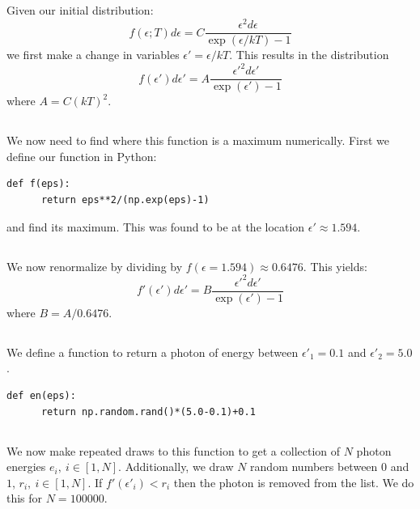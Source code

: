 \documentclass[12pt,a4paper]{article}
\begin{document}
\subsection{}
Given our initial distribution:
\begin{equation*}
  f(\epsilon;T)d\epsilon = C\frac{\epsilon^2d\epsilon}{\exp{(\epsilon/kT)}-1}
\end{equation*}
we first make a change in variables $\epsilon' = \epsilon/kT$. This results
in the distribution
\begin{equation*}
  f(\epsilon')d\epsilon' = A\frac{\epsilon'^2d\epsilon'}{\exp{(\epsilon')}-1}
\end{equation*}
where $A=C(kT)^2$.
\subsection{}
We now need to find where this function is a maximum numerically. First we
define our function in Python:
\begin{lstlisting}[style=custompython]
  def f(eps):
      return eps**2/(np.exp(eps)-1)
\end{lstlisting}
and find its maximum. This was found to be at the 
location $\epsilon'\approx1.594$.
\subsection{}
We now renormalize by dividing by $f(\epsilon=1.594)\approx0.6476$.
This yields:
\begin{equation*}
  f'(\epsilon')d\epsilon' = B\frac{\epsilon'^2d\epsilon'}{\exp{(\epsilon')}-1}
\end{equation*}
where $B=A/0.6476$.
\subsection{}
We define a function to return a photon of energy between $\epsilon'_1=0.1$
and $\epsilon'_2=5.0$.
\begin{lstlisting}[style=custompython]
  def en(eps):
      return np.random.rand()*(5.0-0.1)+0.1
\end{lstlisting}
\subsection{}
We now make repeated draws to this function to get a collection of $N$
photon energies ${e_i},\ i\in[1,N]$. Additionally, we draw $N$ random
numbers between $0$ and $1$, ${r_i},\ i\in[1,N]$. If $f'(\epsilon'_i) < r_i$
then the photon is removed from the list. We do this for $N=100000$.
\end{document}
